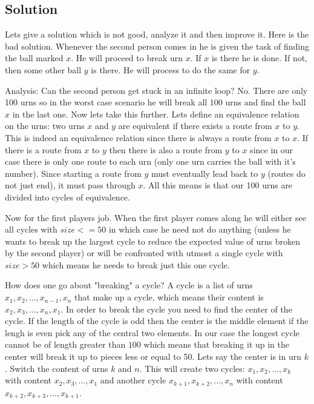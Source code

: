 \documentclass{article}
\begin{document}
\subsection{Solution}
Lets give a solution which is not good, analyze it and then improve it.
Here is the bad solution. Whenever the second person comes in he is given the task of finding the ball marked $x$. He will proceed to break urn $x$. If $x$ is there he is done. If not, then some other ball $y$ is there. He will process to do the same for $y$.

Analysis: Can the second person get stuck in an infinite loop? No. There are only 100 urns so in the worst case scenario he will break all 100 urns and find the ball $x$ in the last one. Now lets take this further. Lets define an equivalence relation on the urns: two urns $x$ and $y$ are equivalent if there exists a route from $x$ to $y$. This is indeed an equivalence relation since there is always a route from $x$ to $x$. If there is a route from $x$ to $y$ then there is also a route from $y$ to $x$ since in our case there is only one route to each urn (only one urn carries the ball with it's number). Since starting a route from $y$ must eventually lead back to $y$ (routes do not just end), it must pass through $x$. All this means is that our 100 urns are divided into cycles of equivalence.

Now for the first players job. When the first player comes along he will either see all cycles with $size<=50$ in which case he need not do anything (unless he wants to break up the largest cycle to reduce the expected value of urns broken by the second player) or will be confronted with utmost a single cycle with $size > 50$ which means he needs to break just this one cycle.

How does one go about "breaking" a cycle? A cycle is a list of urns $x_1, x_2, ...,x_{n-1} ,x_n$ that make up a cycle, which means their content is $x_2, x_3,..., x_n, x_1$. In order to break the cycle you need to find the center of the cycle. If the length of the cycle is odd then the center is the middle element if the lengh is even pick any of the central two elements. In our case the longest cycle cannot be of length greater than $100$ which means that breaking it up in the center will  break it up to pieces less or equal to 50. Lets say the center is in urn $k$. Switch the content of urns $k$ and $n$. This will create two cycles: $x_1, x_2, ... , x_k$ with content $x_2, x_3, ... , x_1$ and another cycle $x_{k+1}, x_{k+2}, ... , x_n$ with content $x_{k+2}, x_{k+3}, ... , x_{k+1}$.
\end{document}
